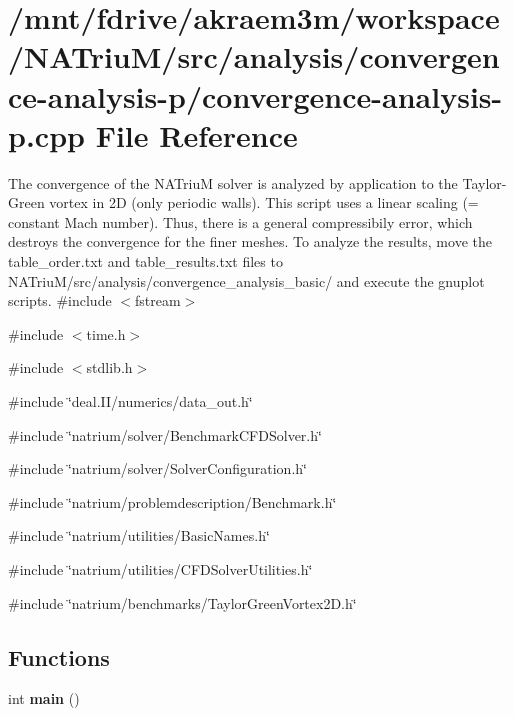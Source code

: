 \hypertarget{convergence-analysis-p_8cpp}{
\section{/mnt/fdrive/akraem3m/workspace/NATriuM/src/analysis/convergence-\/analysis-\/p/convergence-\/analysis-\/p.cpp File Reference}
\label{convergence-analysis-p_8cpp}
}


The convergence of the NATriuM solver is analyzed by application to the Taylor-\/Green vortex in 2D (only periodic walls). This script uses a linear scaling (= constant Mach number). Thus, there is a general compressibily error, which destroys the convergence for the finer meshes. To analyze the results, move the table\_\-order.txt and table\_\-results.txt files to NATriuM/src/analysis/convergence\_\-analysis\_\-basic/ and execute the gnuplot scripts.  
{\ttfamily \#include $<$fstream$>$}\par
{\ttfamily \#include $<$time.h$>$}\par
{\ttfamily \#include $<$stdlib.h$>$}\par
{\ttfamily \#include \char`\"{}deal.II/numerics/data\_\-out.h\char`\"{}}\par
{\ttfamily \#include \char`\"{}natrium/solver/BenchmarkCFDSolver.h\char`\"{}}\par
{\ttfamily \#include \char`\"{}natrium/solver/SolverConfiguration.h\char`\"{}}\par
{\ttfamily \#include \char`\"{}natrium/problemdescription/Benchmark.h\char`\"{}}\par
{\ttfamily \#include \char`\"{}natrium/utilities/BasicNames.h\char`\"{}}\par
{\ttfamily \#include \char`\"{}natrium/utilities/CFDSolverUtilities.h\char`\"{}}\par
{\ttfamily \#include \char`\"{}natrium/benchmarks/TaylorGreenVortex2D.h\char`\"{}}\par
\subsection*{Functions}
\begin{DoxyCompactItemize}
\item 
\hypertarget{convergence-analysis-p_8cpp_ae66f6b31b5ad750f1fe042a706a4e3d4}{
int {\bfseries main} ()}
\label{convergence-analysis-p_8cpp_ae66f6b31b5ad750f1fe042a706a4e3d4}

\end{DoxyCompactItemize}


